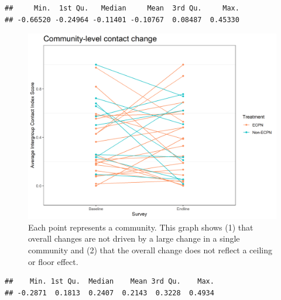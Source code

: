 \documentclass[
]{article}
\newenvironment{Shaded}{\begin{snugshade}}{\end{snugshade}}
\newcommand{\DecValTok}[1]{\textcolor[rgb]{0.00,0.00,0.81}{#1}}
\newcommand{\DocumentationTok}[1]{\textcolor[rgb]{0.56,0.35,0.01}{\textbf{\textit{#1}}}}
\newcommand{\FunctionTok}[1]{\textcolor[rgb]{0.00,0.00,0.00}{#1}}
\newcommand{\NormalTok}[1]{#1}
\newcommand{\SpecialCharTok}[1]{\textcolor[rgb]{0.00,0.00,0.00}{#1}}
\begin{document}
\begin{verbatim}
##     Min.  1st Qu.   Median     Mean  3rd Qu.     Max. 
## -0.66520 -0.24964 -0.11401 -0.10767  0.08487  0.45330
\end{verbatim}

\begin{figure}%
\centering
\includegraphics[width=\linewidth]{../survey_dat/figs/did_plots/conComm_plot_disag.png}
\caption{Each point represents a community. This graph shows (1) that overall changes are not driven by a large change in a single community and (2) that the overall change does not reflect a ceiling or floor effect.}\label{fig:con_comm_dis}
\end{figure}

\begin{Shaded}
\end{Shaded}

\begin{verbatim}
##    Min. 1st Qu.  Median    Mean 3rd Qu.    Max. 
## -0.2871  0.1813  0.2407  0.2143  0.3228  0.4934
\end{verbatim}

\begin{Shaded}
\end{Shaded}
\end{document}
